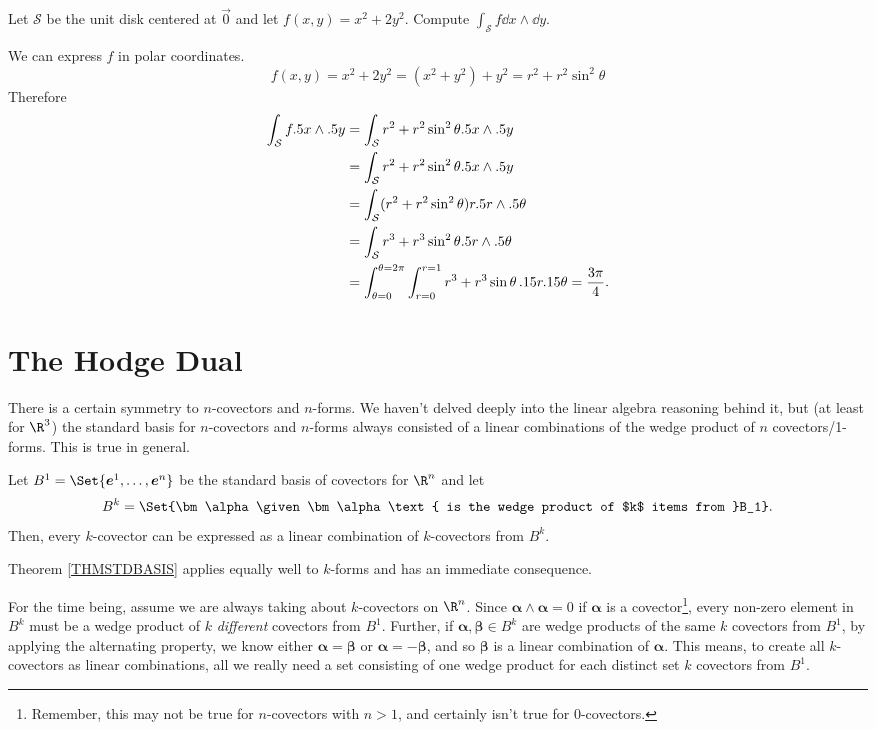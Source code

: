 \begin{example}
	Let $\mathcal S$ be the unit disk centered at $\vec 0$ and let $f(x,y) = x^2+2y^2$.
	Compute $\int_{\mathcal S} f\dd x\wedge \dd y$.

	We can express $f$ in polar coordinates.
	\[
		f(x,y) = x^2+2y^2=(x^2+y^2)+y^2 = r^2+r^2\sin^2 \theta
	\]
	Therefore
	\begin{align*}
		\int_{\mathcal S} f.5 x\wedge .5 y
		&=\int_{\mathcal S} r^2+r^2\sin^2 \theta.5 x\wedge .5 y\\
		&=\int_{\mathcal S} r^2+r^2\sin^2 \theta.5 x\wedge .5 y\\
		&=\int_{\mathcal S} (r^2+r^2\sin^2 \theta) r.5 r\wedge .5 \theta\\
		&=\int_{\mathcal S} r^3+r^3\sin^2 \theta .5 r\wedge .5 \theta\\
		&= \int_{\theta=0}^{\theta =2\pi} \int_{r=0}^{r=1} r^3+r^3\sin \theta \,.15 r.15 \theta = \frac{3\pi}{4}.
	\end{align*}
\end{example}

\section{The Hodge Dual}

There is a certain symmetry to $n$-covectors and $n$-forms.  We haven't delved
deeply into the linear algebra reasoning behind it, but (at least for $\R^3$)
the standard basis for $n$-covectors and $n$-forms always consisted of a linear
combinations of the wedge product of $n$ covectors/1-forms.  This is true in
general.

\begin{theorem}
	\label{THMSTDBASIS}
	Let $B^1=\Set{\bm e^1,\ldots, \bm e^n}$ be the standard basis of covectors
	for $\R^n$ and let \[B^k=\Set{\bm\alpha\given \bm\alpha\text{ is the wedge
	product of $k$ items from }B_1}.\]  Then, every $k$-covector can be expressed
	as a linear combination of $k$-covectors from $B^k$.
\end{theorem}
Theorem \ref{THMSTDBASIS} applies equally well to $k$-forms and has an immediate consequence.

For the time being, assume we are always taking about $k$-covectors on $\R^n$.
Since $\bm \alpha\wedge \bm\alpha=0$ if $\bm\alpha$ is a covector\footnote{
Remember, this may not be true for $n$-covectors with $n>1$, and certainly isn't true
for $0$-covectors.
}, every non-zero element in $B^k$ must be a wedge product of $k$ \emph{different}
covectors from $B^1$.  Further, if $\bm\alpha,\bm\beta\in B^k$ are wedge products of
the same $k$ covectors from $B^1$, by applying the alternating
property, we know either $\bm\alpha=\bm\beta$ or $\bm\alpha=-\bm\beta$, and so
$\bm\beta$ is a linear combination of $\bm\alpha$.   This means, to create all
$k$-covectors as linear combinations, all we really need a set consisting of one wedge
product for each distinct set $k$ covectors from $B^1$.

